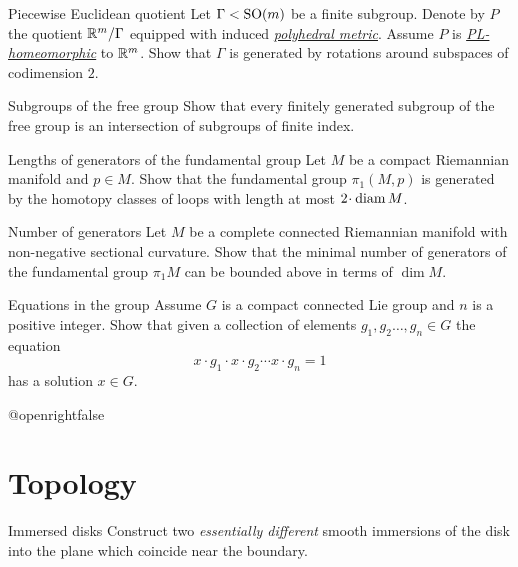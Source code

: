 \documentclass[twoside]{book}
\begin{document}
{{}

\begin{pr}{\easy}{Piecewise Euclidean quotient}\label{Piecewise Euclidean quotient}
Let $\Gamma<\mathrm{SO}(m)$ be a finite subgroup.
Denote by $P$ the quotient $\mathbb{R}^m/\Gamma$ equipped with induced
\hyperref[Polyhedral space]{\emph{polyhedral metric}}.
Assume $P$ is \hyperref[PL-homeomorphism]{\emph{PL-homeomorphic}} to $\mathbb{R}^m$.
Show that $\Gamma$ is generated by rotations  around subspaces of codimension $2$.
\end{pr}

\begin{pr}{\easy}{Subgroups of the free group}\label{Subgroups of free group} 
Show that every finitely generated subgroup of the free group 
is an intersection of subgroups of finite index.
\end{pr}

\begin{pr}{\easy}{Lengths of generators of the fundamental group}\label{Lengths of generators of the fundamental group}
Let $M$ be a compact Riemannian manifold and $p\in M$.
Show that the fundamental group $\pi_1(M,p)$
is generated by the homotopy classes of loops with length at most $2\cdot\diam M$.
\end{pr}

\begin{pr}{}{Number of generators}\label{Number of generators}
Let $M$ be a complete connected Riemannian manifold with non-negative sectional curvature.
Show that the minimal number of generators of the fundamental group $\pi_1 M$
can be bounded above in terms of $\dim M$.
\end{pr}

\begin{pr}{\easy}{Equations in the group}\label{Equations in the group}
Assume $G$ is a compact connected Lie group and $n$ is a positive integer.
Show that given a collection of elements $g_1,g_2\dots,g_n\in G$
the equation 
\[x\cdot g_1\cdot x\cdot g_2\cdots x\cdot g_n=1\]
has a solution $x\in G$.
\end{pr}


\csname @openrightfalse\endcsname
\chapter{Topology}

\begin{pr}{}{Immersed disks}\label{Immersed disks} 
Construct two \emph{essentially different} smooth immersions of the disk 
into the plane which coincide near the boundary. 


\end{pr}}
\end{document}
